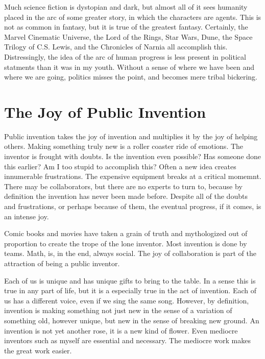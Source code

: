 \documentclass[
	fontsize=10pt, %
	twoside=false, %
	secnumdepth=1, %
]{kaobook}
\begin{document}
Much science fiction is dystopian and dark, but almost all
of it sees humanity placed in the arc of some greater story,
in which the characters are agents.
This is not as common in fantasy, but it is true of the
greatest fantasy.
Certainly, the Marvel Cinematic Universe, the Lord of the Rings,
Star Wars, Dune, the Space Trilogy of C.S. Lewis,
and the Chronicles of Narnia all accomplish this.
Distressingly, the idea of the arc of human progress is
less present in political statments
than it was in my youth.
Without a sense of where we have been and where we are going,
politics misses the point, and becomes mere tribal bickering.

\chapter{The Joy of Public Invention}

Public invention takes the joy of invention and multiplies
it by the joy of helping others.
Making something truly new is a roller coaster ride
of emotions.
The inventor is frought with doubts.
Is the invention even possible?
Has someone done this earlier?
Am I too stupid to accomplish this?
Often a new idea creates innumerable frustrations.
The expensive equipment breaks at a critical momemnt.
There may be collaborators,
but there are no experts to turn to, because by definition
the invention has never been made before.
Despite all of the doubts and frustrations, or
perhaps because of them, the eventual progress, if it
comes, is an intense joy.

Comic books and movies have taken a grain of truth
and mythologized out of proportion to create the trope
of the lone inventor.
Most invention is done by teams.
Math, is, in the end, always social.
The joy of collaboration is part of the attraction
of being a public inventor.

Each of us is unique and has unique gifts to bring
to the table.
In a sense this is true in any part of life,
but it is a especially true in the act of invention.
Each of us has a different voice, even if we sing
the same song.
However, by definition, invention is making something
not just new in the sense of a variation of something
old, however unique, but new in the sense of breaking new
ground.
An invention is not yet another rose, it is a new kind of flower.
Even mediocre inventors such as myself are essential and necessary.
The mediocre work makes the great work easier.
\end{document}
